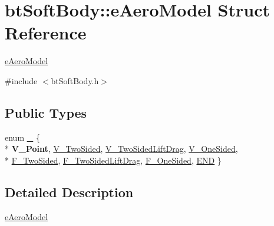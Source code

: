 \hypertarget{structbt_soft_body_1_1e_aero_model}{\section{bt\+Soft\+Body\+:\+:e\+Aero\+Model Struct Reference}
\label{structbt_soft_body_1_1e_aero_model}
}


\hyperlink{structbt_soft_body_1_1e_aero_model}{e\+Aero\+Model}  




{\ttfamily \#include $<$bt\+Soft\+Body.\+h$>$}

\subsection*{Public Types}
\begin{DoxyCompactItemize}
\item 
enum \hyperlink{structbt_soft_body_1_1e_aero_model_a147f4e50f7cfaa2855b5ea5b4b2986ae}{\+\_\+} \{ \\*
{\bfseries V\+\_\+\+Point}, 
\hyperlink{structbt_soft_body_1_1e_aero_model_a147f4e50f7cfaa2855b5ea5b4b2986aea112eb2723581b443eb31003e75769ced}{V\+\_\+\+Two\+Sided}, 
\hyperlink{structbt_soft_body_1_1e_aero_model_a147f4e50f7cfaa2855b5ea5b4b2986aea91f6f6cec759e120ed1666ff684dae4a}{V\+\_\+\+Two\+Sided\+Lift\+Drag}, 
\hyperlink{structbt_soft_body_1_1e_aero_model_a147f4e50f7cfaa2855b5ea5b4b2986aea218d48cb6f6ce0640b193cc655ae05f7}{V\+\_\+\+One\+Sided}, 
\\*
\hyperlink{structbt_soft_body_1_1e_aero_model_a147f4e50f7cfaa2855b5ea5b4b2986aeaae33c1f5ebe9b125c044a4198b6ca3b4}{F\+\_\+\+Two\+Sided}, 
\hyperlink{structbt_soft_body_1_1e_aero_model_a147f4e50f7cfaa2855b5ea5b4b2986aeabf0ee1be501b9fc3aafd6055c2a54c48}{F\+\_\+\+Two\+Sided\+Lift\+Drag}, 
\hyperlink{structbt_soft_body_1_1e_aero_model_a147f4e50f7cfaa2855b5ea5b4b2986aea975eb119297b6320316ed0cac16db8e3}{F\+\_\+\+One\+Sided}, 
\hyperlink{structbt_soft_body_1_1e_aero_model_a147f4e50f7cfaa2855b5ea5b4b2986aea4b021d138b17f22f5e8fab9a253779f2}{E\+N\+D}
 \}
\end{DoxyCompactItemize}


\subsection{Detailed Description}
\hyperlink{structbt_soft_body_1_1e_aero_model}{e\+Aero\+Model} 

